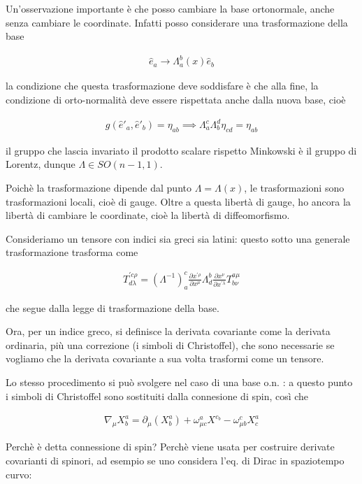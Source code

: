 \documentclass{report}
\begin{document}
Un'osservazione importante è che posso cambiare la base ortonormale, anche senza cambiare le coordinate. Infatti posso considerare una trasformazione della base 

\begin{align}
    \hat{e}_a \rightarrow \Lambda_a^b (x)\hat{e}_b
\end{align}

la condizione che questa trasformazione deve soddisfare è che alla fine, la condizione di orto-normalità deve essere rispettata anche dalla nuova base, cioè 


\begin{align}
    g(\hat{e}'_a, \hat{e}'_b) = \eta_{ab} \implies \Lambda_a^c\Lambda_b^d\eta_{cd} = \eta_{ab}
\end{align}

il gruppo che lascia invariato il prodotto scalare rispetto Minkowski è il gruppo di Lorentz, dunque \(\Lambda \in SO(n-1, 1)\). 

Poichè la trasformazione dipende dal punto \(\Lambda = \Lambda(x)\), le trasformazioni sono trasformazioni locali, cioè di gauge. Oltre a questa libertà di gauge, ho ancora la libertà di cambiare le coordinate, cioè la libertà di diffeomorfismo. 

Consideriamo un tensore con indici sia greci sia latini: questo sotto una generale trasformazione trasforma come

\begin{align}
    T ^{' c\rho}_{d\lambda} = (\Lambda^{-1})_a^c \frac{\partial x^{' \rho}}{\partial x^\mu}\Lambda_d^b\frac{\partial x^\nu}{\partial x^{' \lambda}}T^{a\mu}_{b\nu}
\end{align}


che segue dalla legge di trasformazione della base. 


Ora, per un indice greco, si definisce la derivata covariante come la derivata ordinaria, più una correzione (i simboli di Christoffel), che sono necessarie se vogliamo che la derivata covariante a sua volta trasformi come un tensore. 

Lo stesso procedimento si può svolgere nel caso di una base o.n. : a questo punto i simboli di Christoffel sono sostituiti dalla connesione di spin, così che 

\begin{align}
    \nabla_\mu X^a_b = \partial_\mu(X^a_b) + \omega^a_{\mu c}X^{c_b} - \omega^c_{\mu b}X^a_c
\end{align}

Perchè è detta connessione di spin? Perchè viene usata per costruire derivate covarianti di spinori, ad esempio se uno considera l'eq. di Dirac in spaziotempo curvo: 
\end{document}
